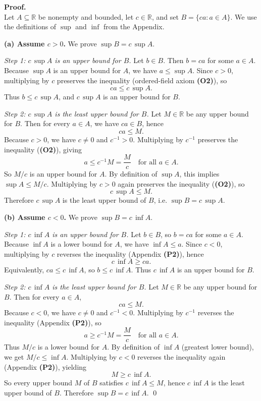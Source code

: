 \documentclass[12pt]{article}
\begin{document}
\textbf{Proof.}\\
Let $A\subseteq\mathbb{R}$ be nonempty and bounded, let $c\in\mathbb{R}$, and set $B=\{ca:a\in A\}$. We use the
definitions of $\sup$ and $\inf$ from the Appendix.

\medskip
\textbf{(a) Assume $c>0$.} We prove $\sup B=c\,\sup A$.

\emph{Step 1: $c\,\sup A$ is an upper bound for $B$.} Let $b\in B$. Then $b=ca$ for some $a\in A$. Because $\sup A$ is an
upper bound for $A$, we have $a\le \sup A$. Since $c>0$, multiplying by $c$ preserves the inequality (ordered-field axiom
\textbf{(O2)}), so
\[
ca\le c\,\sup A.
\]
Thus $b\le c\,\sup A$, and $c\,\sup A$ is an upper bound for $B$.

\emph{Step 2: $c\,\sup A$ is the least upper bound for $B$.} Let $M\in\mathbb{R}$ be any upper bound for $B$. Then for every
$a\in A$, we have $ca\in B$, hence
\[
ca\le M.
\]
Because $c>0$, we have $c\neq 0$ and $c^{-1}>0$. Multiplying by $c^{-1}$ preserves the inequality (\textbf{(O2)}), giving
\[
a\le c^{-1}M = \frac{M}{c} \quad \text{for all } a\in A.
\]
So $M/c$ is an upper bound for $A$. By definition of $\sup A$, this implies $\sup A\le M/c$. Multiplying by $c>0$ again
preserves the inequality (\textbf{(O2)}), so
\[
c\,\sup A\le M.
\]
Therefore $c\,\sup A$ is the least upper bound of $B$, i.e. $\sup B=c\,\sup A$.

\medskip
\textbf{(b) Assume $c<0$.} We prove $\sup B=c\,\inf A$.

\emph{Step 1: $c\,\inf A$ is an upper bound for $B$.} Let $b\in B$, so $b=ca$ for some $a\in A$. Because $\inf A$ is a
lower bound for $A$, we have $\inf A\le a$. Since $c<0$, multiplying by $c$ reverses the inequality (Appendix
\textbf{(P2)}), hence
\[
c\,\inf A \ge ca.
\]
Equivalently, $ca\le c\,\inf A$, so $b\le c\,\inf A$. Thus $c\,\inf A$ is an upper bound for $B$.

\emph{Step 2: $c\,\inf A$ is the least upper bound for $B$.} Let $M\in\mathbb{R}$ be any upper bound for $B$. Then for every
$a\in A$,
\[
ca\le M.
\]
Because $c<0$, we have $c\neq 0$ and $c^{-1}<0$. Multiplying by $c^{-1}$ reverses the inequality (Appendix \textbf{(P2)}),
so
\[
a\ge c^{-1}M = \frac{M}{c} \quad \text{for all } a\in A.
\]
Thus $M/c$ is a lower bound for $A$. By definition of $\inf A$ (greatest lower bound), we get $M/c\le \inf A$.
Multiplying by $c<0$ reverses the inequality again (Appendix \textbf{(P2)}), yielding
\[
M\ge c\,\inf A.
\]
So every upper bound $M$ of $B$ satisfies $c\,\inf A\le M$, hence $c\,\inf A$ is the least upper bound of $B$. Therefore
$\sup B=c\,\inf A$.
\qed
\end{document}
